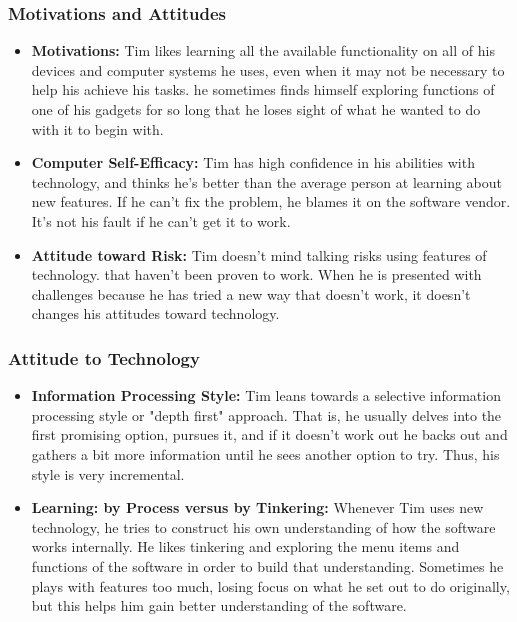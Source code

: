 \documentclass[12pt, titlepage]{article}
\begin{document}
\subsubsection{Motivations and Attitudes}
\begin{itemize}
    \item \textbf{Motivations:} Tim likes learning all the available functionality on all of his devices and computer systems he uses, even when it may not be necessary to help his achieve his tasks. he sometimes finds himself exploring functions of one of his gadgets for so long that he loses sight of what he wanted to do with it to begin with.
    \item \textbf{Computer Self-Efficacy:} Tim has high confidence in his abilities with technology, and thinks he's better than the average person at learning about new features. If he can't fix the problem, he blames it on the software vendor. It's not his fault if he can't get it to work.
    \item \textbf{Attitude toward Risk:} Tim doesn't mind talking risks using features of technology. that haven't been proven to work. When he is presented with challenges because he has tried a new way that doesn't work, it doesn't changes his attitudes toward technology.
\end{itemize}

\subsubsection{Attitude to Technology}
\begin{itemize}
    \item \textbf{Information Processing Style:} Tim leans towards a selective information processing style or "depth first" approach. That is, he usually delves into the first promising option, pursues it, and if it doesn't work out he backs out and gathers a bit more information until he sees another option to try. Thus, his style is very incremental.
    \item \textbf{Learning: by Process versus by Tinkering:} Whenever Tim uses new technology, he tries to construct his own understanding of how the software works internally. He likes tinkering and exploring the menu items and functions of the software in order to build that understanding. Sometimes he plays with features too much, losing focus on what he set out to do originally, but this helps him gain better understanding of the software.
\end{itemize}
\end{document}
